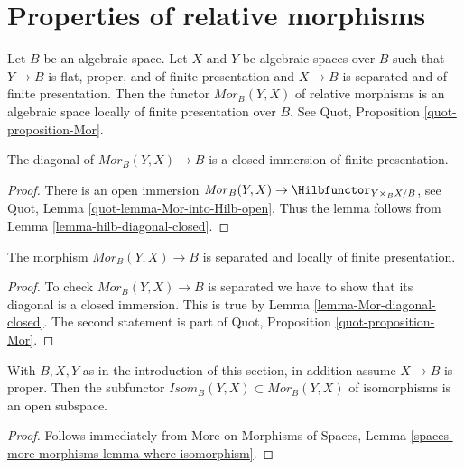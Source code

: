 \section{Properties of relative morphisms}
\label{section-relative-morphisms}

\noindent
Let $B$ be an algebraic space. Let $X$ and $Y$ be algebraic spaces
over $B$ such that $Y \to B$ is flat, proper, and of finite presentation
and $X \to B$ is separated and of finite presentation.
Then the functor $\mathit{Mor}_B(Y, X)$ of relative morphisms
is an algebraic space locally of finite presentation over $B$.
See Quot, Proposition \ref{quot-proposition-Mor}.

\begin{lemma}
\label{lemma-Mor-diagonal-closed}
The diagonal of $\mathit{Mor}_B(Y, X) \to B$ is a closed immersion
of finite presentation.
\end{lemma}

\begin{proof}
There is an open immersion
$\mathit{Mor}_B(Y, X) \to \Hilbfunctor_{Y \times_B X/B}$, see
Quot, Lemma \ref{quot-lemma-Mor-into-Hilb-open}.
Thus the lemma follows from
Lemma \ref{lemma-hilb-diagonal-closed}.
\end{proof}

\begin{lemma}
\label{lemma-Mor-s-lfp}
The morphism $\mathit{Mor}_B(Y, X) \to B$ is separated
and locally of finite presentation.
\end{lemma}

\begin{proof}
To check $\mathit{Mor}_B(Y, X) \to B$ is separated we have to
show that its diagonal is a closed immersion. This
is true by Lemma \ref{lemma-Mor-diagonal-closed}.
The second statement is part of
Quot, Proposition \ref{quot-proposition-Mor}.
\end{proof}

\begin{lemma}
\label{lemma-Isom-in-Mor}
With $B, X, Y$ as in the introduction of this section, in addition
assume $X \to B$ is proper. Then the
subfunctor $\mathit{Isom}_B(Y, X) \subset \mathit{Mor}_B(Y, X)$
of isomorphisms is an open subspace.
\end{lemma}

\begin{proof}
Follows immediately from More on Morphisms of Spaces, Lemma
\ref{spaces-more-morphisms-lemma-where-isomorphism}.
\end{proof}

